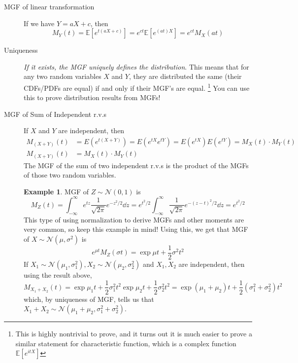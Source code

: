 \documentclass[11pt]{article}
\theoremstyle{definition}
\newtheorem{example}[theo]{\color{Maroon} Example}
\theoremstyle{remark}
\newcommand{\E}[1]{\mathbb{E}\left[ #1 \right]}
\newcommand{\Norm}{\mathcal{N}}
\begin{document}
\begin{description}
\begin{description}
	\item [MGF of linear transformation] If we have $Y = aX + c$, then $$M_Y(t) = \E{e^{t(aX + c)}} =  e^{ct} \E{e^{(at)X}} = e^{ct}M_X(at)$$
	
	\item [Uniqueness] \emph{If it exists, the MGF uniquely defines the distribution}. This means that for any two random variables $X$ and $Y$, they are distributed the same (their CDFs/PDFs are equal) if and only if their MGF's are equal. \footnote{This is highly nontrivial to prove, and it turns out it is much easier to prove a similar statement for characteristic function, which is a complex function $\E{e^{itX}}$} You can use this to prove distribution results from MGFs!
	
	\item [MGF of Sum of Independent r.v.s] If $X$ and $Y$ are independent, then
	\begin{align*}
		M_{(X+Y)}(t) &= E(e^{t(X + Y)}) = E(e^{tX}e^{tY}) = E(e^{tX})E(e^{tY}) = M_X(t) \cdot M_Y(t) \\
		M_{(X+Y)}(t) &= M_X(t) \cdot M_Y(t)
	\end{align*}
	The MGF of the sum of two independent r.v.s is the product of the MGFs of those two random variables.
	
	\begin{example}
	MGF of $Z \sim \Norm(0,1)$ is $$M_Z(t) = \int_{-\infty}^{\infty} e^{tz} \frac{1}{\sqrt{2\pi}} e^{-z^2/2} \dd{z} = e^{t^2/2} \int_{-\infty}^{\infty} \frac{1}{\sqrt{2\pi}} e^{-(z-t)^2/2} \dd{z} = e^{t^2/2}$$ This type of using normalization to derive MGFs and other moments are very common, so keep this example in mind! Using this, we get that MGF of $X \sim \Norm(\mu, \sigma^2)$ is  $$e^{\mu t} M_Z(\sigma t) = \exp{\mu t + \frac{1}{2} \sigma^2 t^2}$$ If $X_1 \sim \Norm(\mu_1, \sigma_1^2), X_2 \sim \Norm(\mu_2, \sigma_2^2)$ and $X_1,X_2$ are independent, then using the result above, $$M_{X_1+X_2}(t) = \exp{\mu_1 t + \frac{1}{2} \sigma_1^2 t^2} \exp{\mu_2 t + \frac{1}{2} \sigma_2^2 t^2} = \exp{(\mu_1+\mu_2) t + \frac{1}{2} (\sigma_1^2 + \sigma_2^2) t^2} $$ which, by uniqueness of MGF, tells us that $X_1+X_2 \sim \Norm(\mu_1 + \mu_2, \sigma_1^2+\sigma_2^2)$.
	\end{example}
	
    \end{description}

\end{description}

\pagebreak
\end{document}
